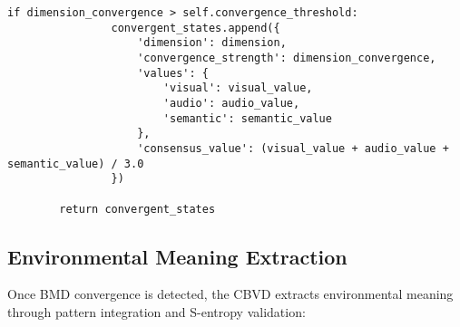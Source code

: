 \documentclass[12pt,a4paper]{article}
\begin{document}
\begin{lstlisting}[style=pythonstyle, caption=BMD Convergence Detection]
            if dimension_convergence > self.convergence_threshold:
                convergent_states.append({
                    'dimension': dimension,
                    'convergence_strength': dimension_convergence,
                    'values': {
                        'visual': visual_value,
                        'audio': audio_value,
                        'semantic': semantic_value
                    },
                    'consensus_value': (visual_value + audio_value + semantic_value) / 3.0
                })
        
        return convergent_states
\end{lstlisting}

\subsection{Environmental Meaning Extraction}

Once BMD convergence is detected, the CBVD extracts environmental meaning through pattern integration and S-entropy validation:
\end{document}
